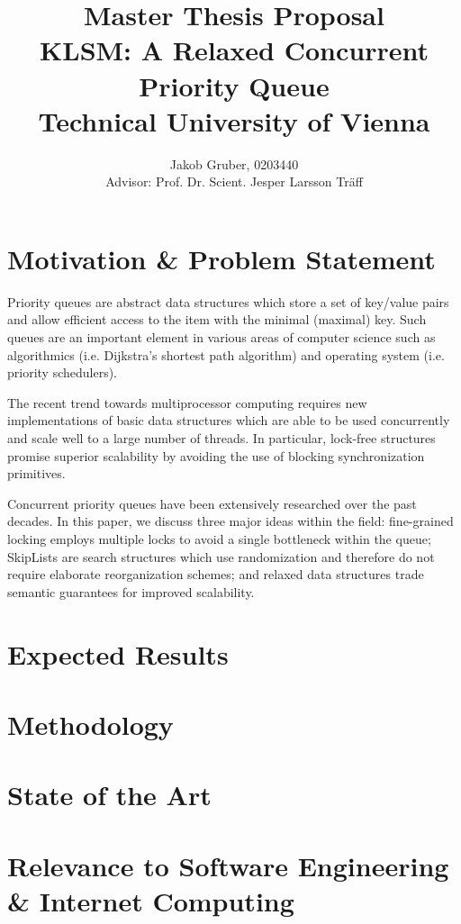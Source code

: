 \documentclass[a4paper,10pt]{article}
\title{Master Thesis Proposal \\
       KLSM: A Relaxed Concurrent Priority Queue \\
       Technical University of Vienna}
\author{Jakob Gruber, 0203440 \\
        Advisor: Prof. Dr. Scient. Jesper Larsson Tr\"aff}
\begin{document}
\maketitle

\begin{comment}
http://www.informatik.tuwien.ac.at/dekanat/abschluss-master

Der Anmeldung der Diplomarbeit ist ein Abstract beizufügen. Das Abstract muss strukturiert in
i) Problemstellung,
ii) erwartetes Resultat,
iii) methodisches Vorgehen,
iv) State-of-the art (inkl. mind. vier Literaturreferenzen) sowie
v) Bezug zum angeführten Studium
abgefasst werden.

Bsp 1: http://www.informatik.tuwien.ac.at/dekanat/Abstract1.pdf
Bsp 2: http://www.informatik.tuwien.ac.at/dekanat/Abstract2.pdf
\end{comment}

\section{Motivation \& Problem Statement}

Priority queues are abstract data structures which store a set of key/value pairs
and allow efficient access to the item with the minimal (maximal) key. Such queues are an important
element in various areas of computer science such as algorithmics (i.e. Dijkstra's shortest
path algorithm) and operating system (i.e. priority schedulers).

The recent trend towards multiprocessor computing requires new implementations of basic
data structures which are able to be used concurrently and scale well to a large number
of threads. In particular, lock-free structures promise superior scalability by avoiding
the use of blocking synchronization primitives.

Concurrent priority queues have been extensively researched over the past decades.
In this paper, we discuss three major ideas within the field: fine-grained locking
employs multiple locks to avoid a single bottleneck within the queue; SkipLists
are search structures which use randomization and therefore do not require elaborate reorganization
schemes; and relaxed data structures trade semantic guarantees for improved scalability.

\section{Expected Results}

\section{Methodology}

\section{State of the Art}

\section{Relevance to Software Engineering \& Internet Computing}

\nocite{*} %
\printbibliography
\end{document}
